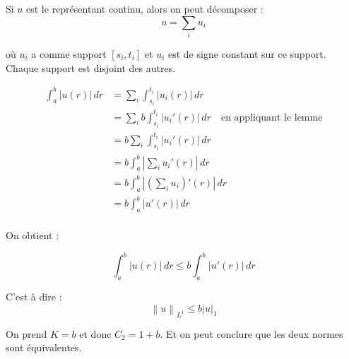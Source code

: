 \documentclass{article}
\newcommand{\Abs}[1]{ \left| #1 \right| }
\newcommand{\Norm}[2]{ \left\| #1 \right\|_{#2} }
\newcommand{\Integral}[4]{ \int_{#1}^{#2} #3 \, d#4 }
\begin{document}
{    Si $u$ est le représentant continu, alors on peut décomposer :
    $$u = \sum_{i} u_i$$

    où $u_i$ a comme support $[s_i, t_i]$ et $u_i$ est de signe constant sur ce support. Chaque support est disjoint des autres.

    \begin{align*}
            \Integral{a}{b}{\Abs{u(r)}}{r} &= \sum_{i} \Integral{s_i}{t_i}{\Abs{u_i(r)}}{r} \\
            &= \sum_{i} b \Integral{s_i}{t_i}{\Abs{u_i'(r)}}{r} \quad \text{en appliquant le lemme}\\
            &= b \sum_{i} \Integral{s_i}{t_i}{\Abs{u_i'(r)}}{r}\\
            &= b  \Integral{a}{b}{\Abs{\sum_{i}u_i'(r)}}{r}\\
            &= b  \Integral{a}{b}{\Abs{\left(\sum_{i}u_i \right)'(r)}}{r}\\
            &= b  \Integral{a}{b}{\Abs{u'(r)}}{r}\\
        \end{align*}

    On obtient :
    
    $$\Integral{a}{b}{\Abs{u(r)}}{r} \leq b \Integral{a}{b}{\Abs{u'(r)}}{r}$$

    C'est à dire :
    $$\Norm{u}{L^1} \leq b \Abs{u}_1$$

    On prend $K = b$ et donc $C_2 = 1 + b$. Et on peut conclure que les deux normes sont équivalentes.
}
\end{document}
